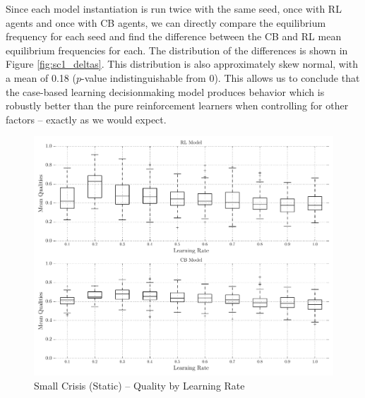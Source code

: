 Since each model instantiation is run twice with the same seed, once with RL agents and once with CB agents, we can directly compare the equilibrium frequency for each seed and find the difference between the CB and RL mean equilibrium frequencies for each. The distribution of the differences is shown in Figure \ref{fig:sc1_deltas}. This distribution is also approximately skew normal, with a mean of 0.18 ($p$-value indistinguishable from 0). This allows us to conclude that the case-based learning decisionmaking model produces behavior which is robustly better than the pure reinforcement learners when controlling for other factors -- exactly as we would expect.

\begin{figure}[h!]
	\includegraphics[width=\textwidth]{WarReason/Figures/SC_1_boxwhiskers}
    \caption{Small Crisis (Static) -- Quality by Learning Rate}
    \label{fig:sc1_boxwhiskers}
    \figSpace
\end{figure}

